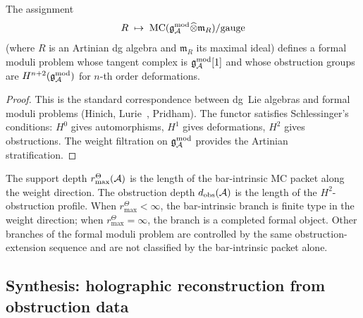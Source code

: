 \begin{proposition}
The assignment
\begin{equation}%
R \;\mapsto\; \MC(\gAmod \widehat{\otimes} \mathfrak{m}_R)
/ \mathrm{gauge}
\end{equation}
(where $R$ is an Artinian dg algebra and $\mathfrak{m}_R$
its maximal ideal) defines a formal moduli problem
whose tangent complex is $\mathfrak{g}_{\mathcal{A}}^{\mathrm{mod}}[1]$ and whose
obstruction groups are
$H^{n+2}(\mathfrak{g}_{\mathcal{A}}^{\mathrm{mod}})$ for $n$-th order deformations.
\end{proposition}

\begin{proof}
This is the standard correspondence between dg~Lie
algebras and formal moduli problems
(Hinich, Lurie~\cite{Lurie-DAG-X},
Pridham). The functor satisfies Schlessinger's
conditions: $H^0$ gives automorphisms, $H^1$ gives
deformations, $H^2$ gives obstructions.
The weight filtration on $\mathfrak{g}_{\mathcal{A}}^{\mathrm{mod}}$ provides the
Artinian stratification.
\end{proof}

The support depth \(r^\Theta_{\max}(\mathcal{A})\) is the length of the
bar-intrinsic MC packet along the weight direction.  The obstruction
depth \(d_{\mathrm{obs}}(\mathcal{A})\) is the length of the \(H^2\)-obstruction
profile.  When \(r^\Theta_{\max}<\infty\), the bar-intrinsic branch is
finite type in the weight direction; when
\(r^\Theta_{\max}=\infty\), the branch is a completed formal object.
Other branches of the formal moduli problem are controlled by the same
obstruction-extension sequence and are not classified by the
bar-intrinsic packet alone.


\subsection{Synthesis: holographic reconstruction from
obstruction data}

